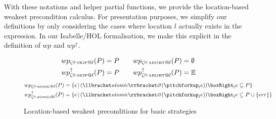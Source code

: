 With these notations and helper partial functions, we provide the location-based weakest precondition calculus. For presentation purposes, we simplify our definitions by only considering the cases where location $l$ actually exists in the expression. In our Isabelle/HOL formalisation, we make this explicit in the definition of $\mathit{wp}$ and $\mathit{wp}^\uparrow$.
\begin{figure}[b]
\begin{align*}
\begin{aligned}[c]
&wp_{\zeta \Vdash \text{\tiny SKIP}@l}(P) = P \\
&wp_{\zeta \Vdash \text{\tiny SKIP}@l}^{\uparrow}(P) = P
\end{aligned}
\quad\quad
\begin{aligned}[c]
&wp_{\zeta \Vdash \text{\tiny ABORT}@l}(P) = \emptyset \\
&wp_{\zeta \Vdash \text{\tiny ABORT}@l}^{\uparrow}(P) = \mathbb{E}
\end{aligned}
\end{align*}
\begin{align*}
    &wp_{\zeta \Vdash \mathit{atomic}@l}(P) = \{e \barr (\llbracket\textit{atomic}\rrbracket\varnothing(\pitchforkup_l e))\boxRight_l e \subseteq P\}\\
    &wp_{\zeta \Vdash \mathit{atomic}@l}^{\uparrow}(P) = \{e \barr (\llbracket\textit{atomic}\rrbracket\varnothing (\pitchforkup_l e))\boxRight_l e \subseteq P \cup \{err\}\}
\end{align*}
    \caption{Location-based weakest preconditions for basic strategies}
    \label{chap4:wp:basic-strategies}
\end{figure}

